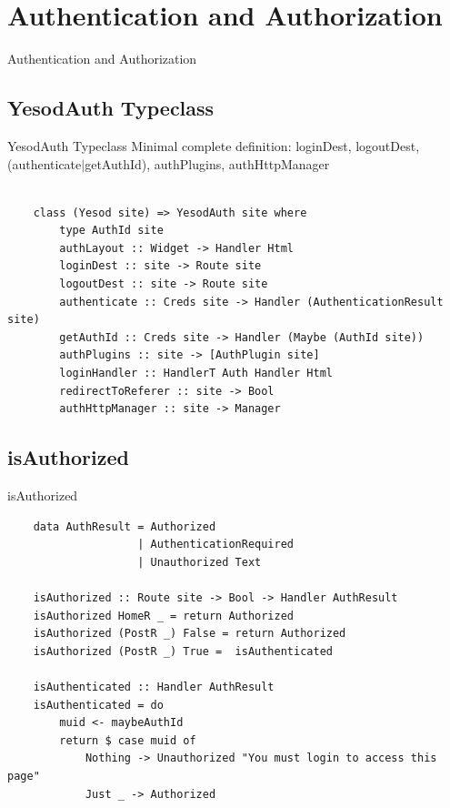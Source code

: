 \documentclass[pdf]{beamer}
\begin{document}
\section{Authentication and Authorization}
\begin{frame}{Authentication and Authorization}
  
\end{frame}

\subsection{YesodAuth Typeclass}
\begin{frame}[fragile]{YesodAuth Typeclass}
  Minimal complete definition: loginDest, logoutDest,
  (authenticate$|$getAuthId), authPlugins, authHttpManager \\
  \\
  \begin{verbatim}
    class (Yesod site) => YesodAuth site where
        type AuthId site
        authLayout :: Widget -> Handler Html
        loginDest :: site -> Route site
        logoutDest :: site -> Route site
        authenticate :: Creds site -> Handler (AuthenticationResult site)
        getAuthId :: Creds site -> Handler (Maybe (AuthId site))
        authPlugins :: site -> [AuthPlugin site]
        loginHandler :: HandlerT Auth Handler Html
        redirectToReferer :: site -> Bool
        authHttpManager :: site -> Manager
  \end{verbatim}
\end{frame}

\subsection{isAuthorized}
\begin{frame}[fragile]{isAuthorized}
  \begin{verbatim}
    data AuthResult = Authorized
                    | AuthenticationRequired
                    | Unauthorized Text

    isAuthorized :: Route site -> Bool -> Handler AuthResult
    isAuthorized HomeR _ = return Authorized
    isAuthorized (PostR _) False = return Authorized
    isAuthorized (PostR _) True =  isAuthenticated

    isAuthenticated :: Handler AuthResult
    isAuthenticated = do
        muid <- maybeAuthId
        return $ case muid of
            Nothing -> Unauthorized "You must login to access this page"
            Just _ -> Authorized
  \end{verbatim}
\end{frame}
\end{document}
